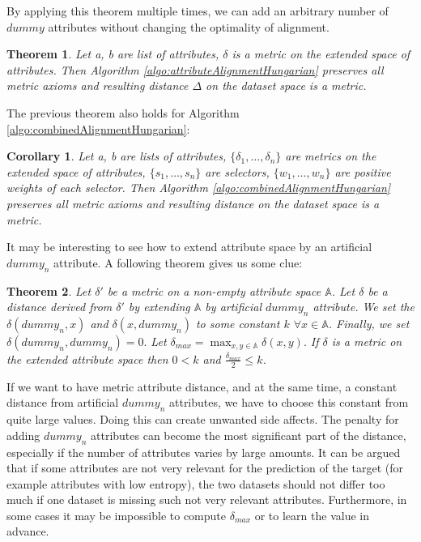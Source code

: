 \documentclass{article}
\newtheorem{corollary}{Corollary}
\newtheorem{theorem}{Theorem}
\newcommand{\attributeDistance}{\delta}
\newcommand{\globalDistance}{\Delta}
\newcommand{\dummy}{dummy}
\newcommand{\dummyoutside}{dummy_n}
\begin{document}
\begin{refsegment}
By applying this theorem multiple times, we can add an arbitrary number of $\dummy$ attributes without changing the optimality of alignment.

\begin{theorem}
	\label{theorem:metricPreservation}
	Let a, b are list of attributes, $\attributeDistance$ is a metric on the extended space of attributes. Then Algorithm \ref{algo:attributeAlignmentHungarian} preserves all metric axioms and resulting distance $\globalDistance$ on the dataset space is a metric.
\end{theorem}

The previous theorem also holds for Algorithm \ref{algo:combinedAlignmentHungarian}:
\begin{corollary}
	\label{corollary:metricPreservation}
	Let a, b are lists of attributes, $\{\attributeDistance_1, \dots, \attributeDistance_n \}$ are metrics on the extended space of attributes, $\{s_1, \dots, s_n\}$ are selectors, $\{w_1, \dots, w_n\}$ are positive weights of each selector. Then Algorithm \ref{algo:combinedAlignmentHungarian} preserves all metric axioms and resulting distance on the dataset space is a metric.	
\end{corollary}

It may be interesting to see how to extend attribute space by an artificial $\dummyoutside$ attribute. A following theorem gives us some clue: 
\begin{theorem}
	\label{theorem:dummyConstantMinimalDistance}
	Let $\attributeDistance'$ be a metric on a non-empty attribute space $\mathbb{A}$.	Let $\attributeDistance$ be a distance derived from $\attributeDistance'$ by extending  $\mathbb{A}$ by artificial $\dummyoutside$ attribute. We set the $\attributeDistance(\dummyoutside, x)$ and $\attributeDistance(x, \dummyoutside)$ to some constant $k$ $\forall x \in \mathbb{A}$. Finally, we set $\attributeDistance(\dummyoutside, \dummyoutside)=0.$ Let $\attributeDistance_{max}=\max_{x,y \in \mathbb{A}}\attributeDistance(x,y).$ If $\attributeDistance$ is a metric on the extended attribute space then $0 < k$ and $\frac{\attributeDistance_{max}}{2} \le k$.	
\end{theorem}

If we want to have metric attribute distance, and at the same time, a constant distance from artificial $\dummyoutside$ attributes, we have to choose this constant from quite large values. Doing this can create unwanted side affects. The penalty for adding $\dummyoutside$ attributes can become the most significant part of the distance, especially if the number of attributes varies by large amounts. It can be argued that if some attributes are not very relevant for the prediction of the target (for example attributes with low entropy), the two datasets should not differ too much if one dataset is missing such not very relevant attributes. Furthermore, in some cases it may be impossible to compute $\delta_{max}$ or to learn the value in advance. 


\end{refsegment}
\end{document}
